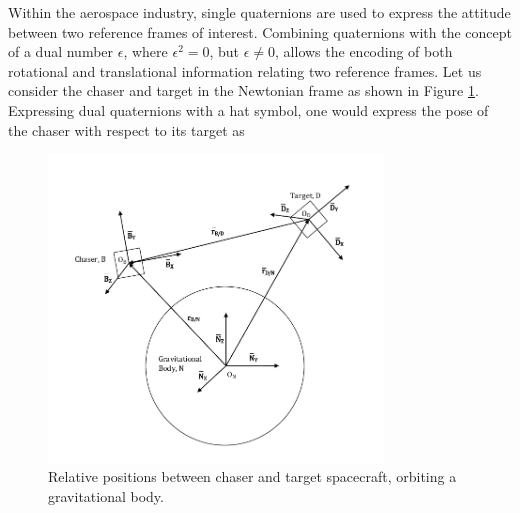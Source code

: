 \documentclass[letterpaper, preprint, paper,11pt]{AAS}	%
\begin{document}
Within the aerospace industry, single quaternions are used to express the attitude between two reference frames of interest. Combining quaternions with the concept of a dual number $\epsilon$, where $\epsilon^2 = 0$, but $\epsilon \ne 0$, allows the encoding of both rotational and translational information relating two reference frames. Let us consider the chaser and target in the Newtonian frame as shown in Figure \ref{fig:Rel_Pos}. Expressing dual quaternions with a hat symbol, one would express the pose of the chaser with respect to its target as

\begin{figure}[h!]
	\centering\includegraphics[width=3.5in]{Figures/REL_POSE.pdf}
	\caption{Relative positions between chaser and target spacecraft, orbiting a gravitational body.}
	\label{fig:Rel_Pos}
\end{figure}
\end{document}

